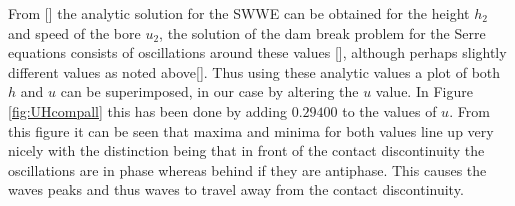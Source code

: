 \documentclass[SingleSpace,12pt,Journal]{Serre_ASCE}
\begin{document}
From [] the analytic solution for the SWWE can be obtained for the height $h_2$ and speed of the bore $u_2$, the solution of the dam break problem for the Serre equations consists of oscillations around these values [], although perhaps slightly different values as noted above[]. Thus using these analytic values a plot of both $h$ and $u$ can be superimposed, in our case by altering the $u$ value. In Figure \ref{fig:UHcompall} this has been done by adding $0.29400$ to the values of $u$. From this figure it can be seen that maxima and minima for both values line up very nicely with the distinction being that in front of the contact discontinuity the oscillations are in phase whereas behind if they are antiphase. This causes the waves peaks and thus waves to travel away from the contact discontinuity. 
\end{document}
